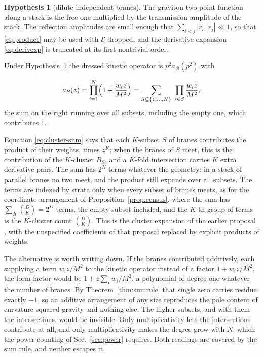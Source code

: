 \documentclass[aps,prd,10pt,twocolumn,superscriptaddress,nofootinbib,floatfix,longbibliography,showpacs,showkeys]{revtex4-2}
\theoremstyle{plain}
\theoremstyle{definition}
\newtheorem{hypothesis}{Hypothesis}
\theoremstyle{remark}
\newcommand{\cB}{\mathcal{B}}
\begin{document}
\begin{hypothesis}[dilute independent branes]
\label{hyp:mult}
The graviton two-point function along a stack is the free one multiplied by the transmission amplitude of the stack. The reflection amplitudes are small enough that $\sum_{i<j}|r_i||r_j|\ll1$, so that \eqref{eq:product} may be used with $\mathcal E$ dropped, and the derivative expansion \eqref{eq:derivexp} is truncated at its first nontrivial order.
\end{hypothesis}

Under Hypothesis~\ref{hyp:mult} the dressed kinetic operator is $p^2a_\cB(p^2)$ with

\begin{equation}
\label{eq:cluster-sum}
a_\cB(z)=\prod_{i=1}^{N}\Bigl(1+\frac{w_iz}{M^2}\Bigr)
=\sum_{S\subseteq\{1,\dots,N\}}\ \prod_{i\in S}\frac{w_iz}{M^2},
\end{equation}
the sum on the right running over all subsets, including the empty one, which contributes $1$.

Equation \eqref{eq:cluster-sum} says that each $K$-subset $S$ of branes contributes the product of their weights, times $z^K$; when the branes of $S$ meet, this is the contribution of the $K$-cluster $B_S$, and a $K$-fold intersection carries $K$ extra derivative pairs. The sum has $2^N$ terms whatever the geometry: in a stack of parallel branes no two meet, and the product still expands over all subsets. The terms are indexed by strata only when every subset of branes meets, as for the coordinate arrangement of Proposition~\ref{prop:census}, where the sum has $\sum_K\binom{D}{K}=2^D$ terms, the empty subset included, and the $K$-th group of terms is the $K$-cluster count $\binom DK$. This is the cluster expansion of the earlier proposal \cite{Bhattacharjee2025brane}, with the unspecified coefficients of that proposal replaced by explicit products of weights.

The alternative is worth writing down. If the branes contributed additively, each supplying a term $w_iz/M^2$ to the kinetic operator instead of a factor $1+w_iz/M^2$, the form factor would be $1+z\sum_iw_i/M^2$, a polynomial of degree one whatever the number of branes. By Theorem~\ref{thm:sumrule} that single zero carries residue exactly $-1$, so an additive arrangement of any size reproduces the pole content of curvature-squared gravity and nothing else. The higher subsets, and with them the intersections, would be invisible. Only multiplicativity lets the intersections contribute at all, and only multiplicativity makes the degree grow with $N$, which the power counting of Sec.~\ref{sec:power} requires. Both readings are covered by the sum rule, and neither escapes it.
\end{document}

